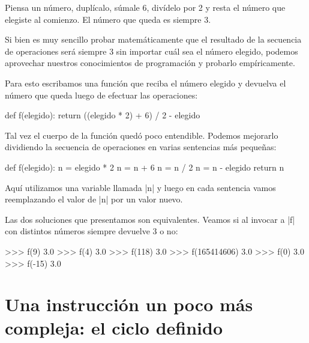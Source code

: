 \begin{problema}
Piensa un número, duplícalo, súmale 6, divídelo por 2 y resta el número
que elegiste al comienzo. El número que queda es siempre 3.
\end{problema}

\begin{solucion}
Si bien es muy sencillo probar matemáticamente que el resultado de la secuencia
de operaciones será siempre 3 sin importar cuál sea el número elegido, podemos
aprovechar nuestros conocimientos de programación y probarlo empíricamente.

Para esto escribamos una función que reciba el número elegido y devuelva el
número que queda luego de efectuar las operaciones:

\begin{codigo-python-sn}
def f(elegido):
    return ((elegido * 2) + 6) / 2 - elegido
\end{codigo-python-sn}

Tal vez el cuerpo de la función quedó poco entendible. Podemos mejorarlo
dividiendo la secuencia de operaciones en varias sentencias más pequeñas:

\begin{codigo-python-sn}
def f(elegido):
	n = elegido * 2
	n = n + 6
	n = n / 2
	n = n - elegido
	return n
\end{codigo-python-sn}

Aquí utilizamos una variable llamada |n| y luego en cada sentencia vamos
reemplazando el valor de |n| por un valor nuevo.

Las dos soluciones que presentamos son equivalentes. Veamos si al invocar a |f|
con distintos números siempre devuelve 3 o no:

\begin{codigo-python-sn}
>>> f(9)
3.0
>>> f(4)
3.0
>>> f(118)
3.0
>>> f(165414606)
3.0
>>> f(0)
3.0
>>> f(-15)
3.0
\end{codigo-python-sn}
\end{solucion}

\section{Una instrucción un poco más compleja: el ciclo definido}

